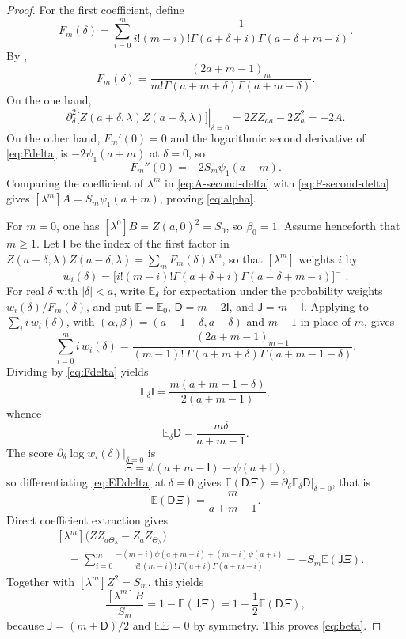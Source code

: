 \documentclass[11pt,a4paper]{amsart}
\numberwithin{equation}{section}
\theoremstyle{plain}
\theoremstyle{definition}
\newcommand{\E}{\mathbb E}
\newcommand{\Dfin}{\mathsf D}
\newcommand{\Thetal}{\Theta_{\lambda}}
\begin{document}
\begin{proof}
For the first coefficient, define
\[
 F_m(\delta)=
 \sum_{i=0}^m
 \frac1{i!(m-i)!\Gamma(a+\delta+i)\Gamma(a-\delta+m-i)}.
\]
By ,
\begin{equation}\label{eq:Fdelta}
 F_m(\delta)=
 \frac{(2a+m-1)_m}
 {m!\Gamma(a+m+\delta)\Gamma(a+m-\delta)}.
\end{equation}
On the one hand,
\begin{equation}\label{eq:A-second-delta}
 \left.\partial_\delta^2
 \bigl[Z(a+\delta,\lambda)Z(a-\delta,\lambda)\bigr]
 \right|_{\delta=0}
 =2ZZ_{aa}-2Z_a^2=-2A.
\end{equation}
On the other hand, \(F_m'(0)=0\) and the logarithmic second derivative of
\eqref{eq:Fdelta} is \(-2\psi_1(a+m)\) at \(\delta=0\), so
\begin{equation}\label{eq:F-second-delta}
 F_m''(0)=-2S_m\psi_1(a+m).
\end{equation}
Comparing the coefficient of \(\lambda^m\) in
\eqref{eq:A-second-delta} with \eqref{eq:F-second-delta} gives
\([\lambda^m]A=S_m\psi_1(a+m)\), proving \eqref{eq:alpha}.

For \(m=0\), one has \([\lambda^0]B=Z(a,0)^2=S_0\), so \(\beta_0=1\).
Assume henceforth that \(m\ge1\).  Let \(\mathsf I\) be the index of the first factor in
\(Z(a+\delta,\lambda)Z(a-\delta,\lambda)=\sum_mF_m(\delta)\lambda^m\), so that
\([\lambda^m]\) weights \(i\) by
\[
 w_i(\delta)=\bigl[i!(m-i)!\Gamma(a+\delta+i)\Gamma(a-\delta+m-i)\bigr]^{-1}.
\]
For real \(\delta\) with \(|\delta|<a\), write \(\E_\delta\) for expectation
under the probability weights \(w_i(\delta)/F_m(\delta)\), and put
\(\E=\E_0\), \(\Dfin=m-2\mathsf I\), and \(\mathsf J=m-\mathsf I\).  Applying  to
\(\sum_i i\,w_i(\delta)\), with \((\alpha,\beta)=(a+1+\delta,a-\delta)\) and \(m-1\) in
place of \(m\), gives
\[
 \sum_{i=0}^m i\,w_i(\delta)
 =\frac{(2a+m-1)_{m-1}}
 {(m-1)!\,\Gamma(a+m+\delta)\Gamma(a+m-1-\delta)}.
\]
Dividing by \eqref{eq:Fdelta} yields
\[
 \E_\delta \mathsf I=\frac{m(a+m-1-\delta)}{2(a+m-1)},
\]
whence
\begin{equation}\label{eq:EDdelta}
 \E_\delta\Dfin=\frac{m\delta}{a+m-1}.
\end{equation}
The score \(\partial_\delta\log w_i(\delta)\big|_{\delta=0}\) is
\[
 \Xi=\psi(a+m-\mathsf I)-\psi(a+\mathsf I),
\]
so differentiating \eqref{eq:EDdelta} at \(\delta=0\) gives
\(\E(\Dfin \Xi)=\partial_\delta\E_\delta\Dfin|_{\delta=0}\), that is
\begin{equation}\label{eq:EDXi}
 \E(\Dfin \Xi)=\frac{m}{a+m-1}.
\end{equation}
Direct coefficient extraction gives
\begin{align*}
 &[\lambda^m]\bigl(ZZ_{a\Thetal}-Z_aZ_{\Thetal}\bigr)\\
 &\quad=\sum_{i=0}^m
 \frac{-(m-i)\psi(a+m-i)+(m-i)\psi(a+i)}
 {i!\,(m-i)!\,\Gamma(a+i)\Gamma(a+m-i)}
 =-S_m\E(\mathsf J\Xi).
\end{align*}
Together with \([\lambda^m]Z^2=S_m\), this yields
\[
 \frac{[\lambda^m]B}{S_m}=1-\E(\mathsf J\Xi)
 =1-\frac12\E(\Dfin \Xi),
\]
because \(\mathsf J=(m+\Dfin)/2\) and \(\E\Xi=0\) by symmetry.  This proves
\eqref{eq:beta}.


\end{proof}
\end{document}
